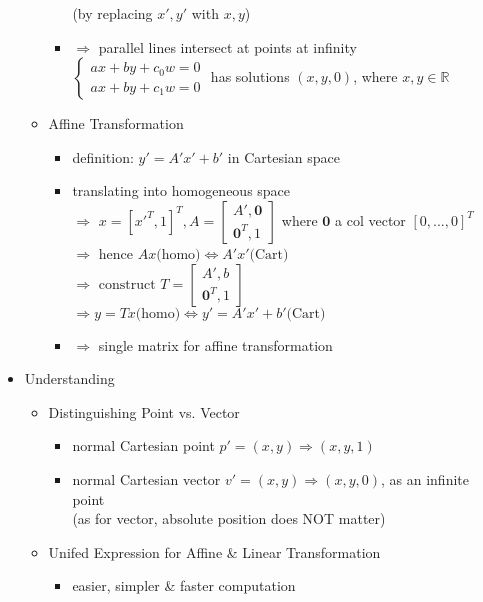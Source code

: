 \begin{itemize}
\begin{itemize}
\begin{itemize}
		(by replacing $x',y'$ with $x, y$)
		\item $\Rightarrow$ parallel lines intersect at points at infinity \\
		$\begin{cases} ax + by + c_0 w = 0 \\ ax + by + c_1 w = 0 \end{cases}$ has solutions $(x,y,0)$, where $x,y\in \mathbb R$ 
		\end{itemize}
	\item Affine Transformation
		\begin{itemize}
	    \item definition: $y'=A'x'+b'$ in Cartesian space
	    \item translating into homogeneous space \\
	    $\Rightarrow$ $x = [x'^T,1]^T, A=\begin{bmatrix} A', \mathbf 0 \\ \mathbf 0^T, 1 \end{bmatrix}$ where $\mathbf 0$ a col vector $[0,...,0]^T$ \\ 
	    $\Rightarrow$ hence $Ax \text{(homo)} \Leftrightarrow A'x' \text{(Cart)}$ \\
	    $\Rightarrow \text{ construct } T = \begin{bmatrix} A', b \\ \mathbf 0^T, 1 \end{bmatrix}$\\
	    $\Rightarrow y=Tx \text{(homo)}  \Leftrightarrow  y'=A'x'+b' \text{(Cart)}$
	    \item $\Rightarrow$ single matrix for affine transformation 
		\end{itemize}
	\end{itemize}
\item Understanding
	\begin{itemize}
	\item Distinguishing Point vs. Vector
		\begin{itemize}
		\item normal Cartesian point $p' = (x,y) \Rightarrow (x,y,1)$
		\item normal Cartesian vector $v' = (x,y) \Rightarrow (x,y, 0)$, as an infinite point \\
		(as for vector, absolute position does NOT matter)
		\end{itemize}
  	\item Unifed Expression for Affine \& Linear Transformation
  		\begin{itemize}
  		\item easier, simpler \& faster computation
  		\end{itemize}
	\end{itemize}
\end{itemize}
 

